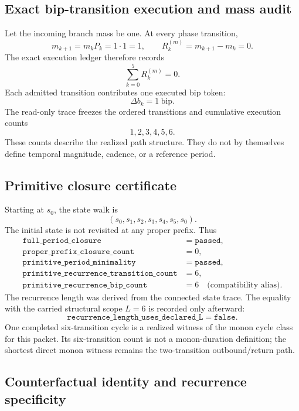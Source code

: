 \subsection{Exact bip-transition execution and mass audit}

Let the incoming branch mass be one.  At every phase transition,
\[
m_{k+1}=m_kP_k=1\cdot1=1,
\qquad
R^{(m)}_k=m_{k+1}-m_k=0.
\]
The exact execution ledger therefore records
\[
\sum_{k=0}^{5}R^{(m)}_k=0.
\]
Each admitted transition contributes one executed bip token:
\[
\Delta b_k=1\ \mathrm{bip}.
\]
The read-only trace freezes the ordered transitions and cumulative execution
counts
\[
1,2,3,4,5,6.
\]
These counts describe the realized path structure.  They do not by themselves
define temporal magnitude, cadence, or a reference period.

\subsection{Primitive closure certificate}

Starting at $s_0$, the state walk is
\[
(s_0,s_1,s_2,s_3,s_4,s_5,s_0).
\]
The initial state is not revisited at any proper prefix.  Thus
\[
\begin{aligned}
\texttt{full\_period\_closure}&=\texttt{passed},\\
\texttt{proper\_prefix\_closure\_count}&=0,\\
\texttt{primitive\_period\_minimality}&=\texttt{passed},\\
\texttt{primitive\_recurrence\_transition\_count}&=6,\\
\texttt{primitive\_recurrence\_bip\_count}&=6\quad\text{(compatibility alias)}.
\end{aligned}
\]
The recurrence length was derived from the connected state trace.  The equality
with the carried structural scope $L=6$ is recorded only afterward:
\[
\texttt{recurrence\_length\_uses\_declared\_L}=\texttt{false}.
\]
One completed six-transition cycle is a realized witness of the monon cycle
class for this packet.  Its six-transition count is not a monon-duration
definition; the shortest direct monon witness remains the two-transition
outbound/return path.

\subsection{Counterfactual identity and recurrence specificity}


